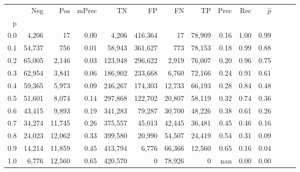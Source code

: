 \begin{tabular}{rrrrrrrrrrrrrr}
\toprule
{} &     Neg &     Pos & mPrec &       TN &       FP &      FN &      TP &  Prec &   Rec & $\hat{p}$ \\
p   &         &         &       &          &          &         &         &       &       &           \\
\midrule
0.0 &   4,206 &      17 &  0.00 &    4,206 &  416,364 &      17 &  78,909 &  0.16 &  1.00 &      0.99 \\
0.1 &  54,737 &     756 &  0.01 &   58,943 &  361,627 &     773 &  78,153 &  0.18 &  0.99 &      0.88 \\
0.2 &  65,005 &   2,146 &  0.03 &  123,948 &  296,622 &   2,919 &  76,007 &  0.20 &  0.96 &      0.75 \\
0.3 &  62,954 &   3,841 &  0.06 &  186,902 &  233,668 &   6,760 &  72,166 &  0.24 &  0.91 &      0.61 \\
0.4 &  59,365 &   5,973 &  0.09 &  246,267 &  174,303 &  12,733 &  66,193 &  0.28 &  0.84 &      0.48 \\
0.5 &  51,601 &   8,074 &  0.14 &  297,868 &  122,702 &  20,807 &  58,119 &  0.32 &  0.74 &      0.36 \\
0.6 &  43,415 &   9,893 &  0.19 &  341,283 &   79,287 &  30,700 &  48,226 &  0.38 &  0.61 &      0.26 \\
0.7 &  34,274 &  11,745 &  0.26 &  375,557 &   45,013 &  42,445 &  36,481 &  0.45 &  0.46 &      0.16 \\
0.8 &  24,023 &  12,062 &  0.33 &  399,580 &   20,990 &  54,507 &  24,419 &  0.54 &  0.31 &      0.09 \\
0.9 &  14,214 &  11,859 &  0.45 &  413,794 &    6,776 &  66,366 &  12,560 &  0.65 &  0.16 &      0.04 \\
1.0 &   6,776 &  12,560 &  0.65 &  420,570 &        0 &  78,926 &       0 &   nan &  0.00 &      0.00 \\
\bottomrule
\end{tabular}
